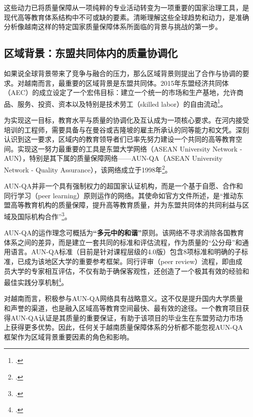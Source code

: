 这些动力已将质量保障从一项纯粹的专业活动转变为一项重要的国家治理工具，是现代高等教育体系结构中不可或缺的要素。清晰理解这些全球趋势和动力，是准确分析像越南这样的特定国家质量保障体系所面临的背景与挑战的第一步。

\subsection{区域背景：东盟共同体内的质量协调化}
\label{subsec:boi_canh_khu_vuc}

如果说全球背景带来了竞争与融合的压力，那么区域背景则提出了合作与协调的要求。对越南而言，最重要的区域背景是东盟共同体。2015年东盟经济共同体（AEC）的成立设定了一个宏伟目标：建立一个统一的市场和生产基地，允许商品、服务、投资、资本以及特别是技术劳工（skilled labor）的自由流动\footcite{ASEAN_AEC_Blueprint}。

为实现这一目标，教育水平与质量的协调化及互认成为一项核心要求。在河内接受培训的工程师，需要具备与在曼谷或吉隆坡的雇主所承认的同等能力和文凭。深刻认识到这一要求，区域内的教育领导者们已率先努力建设一个共同的高等教育空间。实现这一努力最重要的工具是东盟大学网络（ASEAN University Network - AUN），特别是其下属的质量保障网络——AUN-QA（ASEAN University Network - Quality Assurance），该网络成立于1998年\footcite{AUNQA_History}。

AUN-QA并非一个具有强制权力的超国家认证机构，而是一个基于自愿、合作和同行学习（peer learning）原则运作的网络。其使命如官方文件所述，是“推动东盟高等教育机构的质量保障，提升高等教育质量，并为东盟共同体的共同利益与区域及国际机构合作”\footcite{AUN-QAGuide}。

AUN-QA的运作理念可概括为\textbf{“多元中的和谐”}原则。该网络不寻求消除各国教育体系之间的差异，而是建立一套共同的标准和评估流程，作为质量的“公分母”和通用语言。AUN-QA标准（目前是针对课程层级的4.0版）包含8项标准和明确的子标准，已成为该地区大学的重要参考框架。同行评审（peer review）流程，即由成员大学的专家相互评估，不仅有助于确保客观性，还创造了一个极其有效的经验和最佳实践分享机制\footcite{AUNQA_Report2023}。

对越南而言，积极参与AUN-QA网络具有战略意义。这不仅是提升国内大学质量和声誉的渠道，也是融入区域高等教育空间最快、最有效的途径。一个教育项目获得AUN-QA认证是其质量的重要保证，有助于该项目的毕业生在东盟劳动力市场上获得更多优势。因此，任何关于越南质量保障体系的分析都不能忽视AUN-QA框架作为区域背景重要因素的角色和影响。